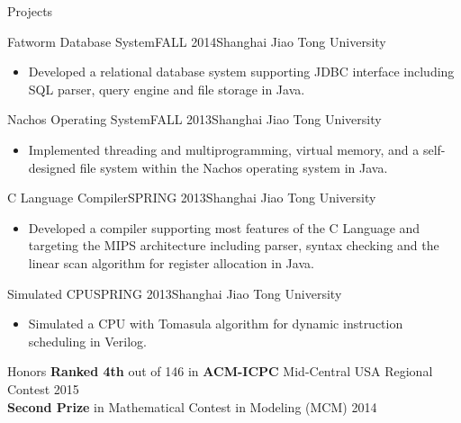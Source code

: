 \documentclass{resume} %
\begin{document}
\begin{rSection}{Projects}%

\begin{rSubsection}{Fatworm Database System}{FALL 2014}{Shanghai Jiao Tong University}
\begin{itemize}
\item Developed a relational database system supporting JDBC interface including SQL parser, query engine and file storage in Java.
\end{itemize}
\end{rSubsection}
\vspace{3pt}
\begin{rSubsection}{Nachos Operating System}{FALL 2013}{Shanghai Jiao Tong University}
\begin{itemize}
\item Implemented threading and multiprogramming, virtual memory, and a self-designed file system within the Nachos operating system in Java.
\end{itemize}
\end{rSubsection}
\vspace{3pt}
\begin{rSubsection}{C Language Compiler}{SPRING 2013}{Shanghai Jiao Tong University}
\begin{itemize}
\item Developed a compiler supporting most features of the C Language and targeting the MIPS architecture including parser, syntax checking and the linear scan algorithm for register allocation in Java.
\end{itemize}
\end{rSubsection}
\vspace{3pt}
\begin{rSubsection}{Simulated CPU}{SPRING 2013}{Shanghai Jiao Tong University}
\begin{itemize}
\item Simulated a CPU with Tomasula algorithm for dynamic instruction scheduling in Verilog.
\end{itemize}
\end{rSubsection}

\end{rSection}


\begin{rSection}{Honors}
\textbf{Ranked 4th} out of 146 in \textbf{ACM-ICPC} Mid-Central USA Regional Contest \hfill 2015\\
\textbf{Second Prize} in Mathematical Contest in Modeling (MCM) \hfill 2014\\
\end{rSection}

\end{document}
